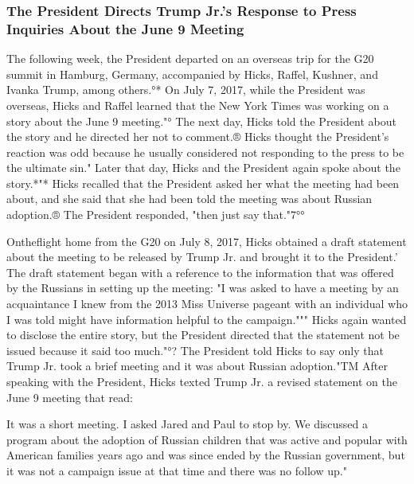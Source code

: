 \subsubsection{The President Directs Trump Jr.'s Response to Press Inquiries About the June 9 Meeting}

The following week, the President departed on an overseas trip for the G20 summit in Hamburg, Germany, accompanied by Hicks, Raffel, Kushner, and Ivanka Trump, among others.°*
On July 7, 2017, while the President was overseas, Hicks and Raffel learned that the New York Times was working on a story about the June 9 meeting."°
The next day, Hicks told the President about the story and he directed her not to comment.®
Hicks thought the President's reaction was odd because he usually considered not responding to the press to be the ultimate sin."
Later that day, Hicks and the President again spoke about the story.*"*
Hicks recalled that the President asked her what the meeting had been about, and she said that she had been told the meeting was about Russian adoption.® The President responded, "then just say that."7°°

Ontheflight home from the G20 on July 8, 2017, Hicks obtained a draft statement about the meeting to be released by Trump Jr. and brought it to the President.'
The draft statement began with a reference to the information that was offered by the Russians in setting up the meeting: "I was asked to have a meeting by an acquaintance I knew from the 2013 Miss Universe pageant with an individual who I was told might have information helpful to the campaign."""
Hicks again wanted to disclose the entire story, but the President directed that the statement not be
issued because it said too much."°? The President told Hicks to say only that Trump Jr. took a brief meeting and it was about Russian adoption."TM
After speaking with the President, Hicks texted Trump Jr. a revised statement on the June 9 meeting that read:

It was a short meeting.
I asked Jared and Paul to stop by.
We discussed a program about the adoption of Russian children that was active and popular with American families years ago and was since ended by the Russian government, but it was not a campaign issue at that time and there was no follow up."

